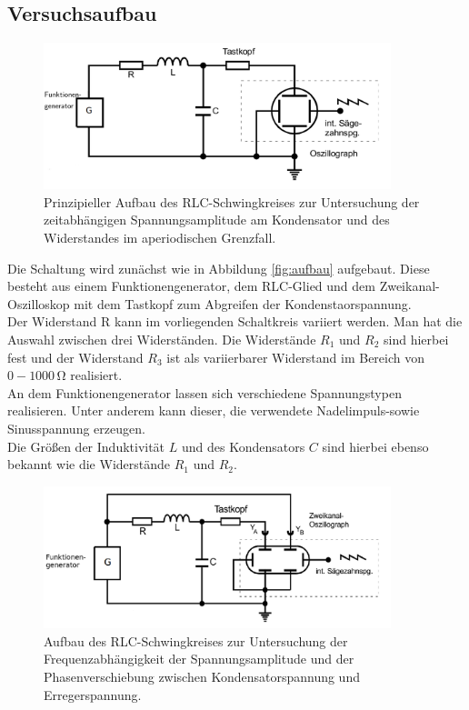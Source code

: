 \subsection{Versuchsaufbau}
\label{sec:Versuchsaufbau}
\begin{figure}
  \centering
  \includegraphics[width=0.9\textwidth]{Bilder/aufbaau.png}
  \caption{Prinzipieller Aufbau des RLC-Schwingkreises zur Untersuchung der zeitabhängigen Spannungsamplitude am Kondensator und des Widerstandes im aperiodischen Grenzfall.}
  \label{fig:aufbau}
\end{figure}
Die Schaltung wird zunächst wie in Abbildung \eqref{fig:aufbau} aufgebaut. Diese besteht aus einem Funktionengenerator, dem RLC-Glied und dem Zweikanal-Oszilloskop mit dem Tastkopf zum Abgreifen der Kondenstaorspannung.\\
Der Widerstand R kann im vorliegenden Schaltkreis variiert werden. Man hat die Auswahl zwischen drei Widerständen. Die Widerstände $R_\text{1}$ und $R_\text{2}$ sind hierbei fest und der Widerstand $R_\text{3}$ ist als variierbarer Widerstand im Bereich von $0-1000\,\si{\ohm}$ realisiert.\\
An dem Funktionengenerator lassen sich verschiedene Spannungstypen realisieren. Unter anderem kann dieser, die verwendete Nadelimpuls-sowie Sinusspannung erzeugen.\\
Die Größen der Induktivität $L$ und des Kondensators $C$ sind hierbei ebenso bekannt wie die Widerstände $R_\text{1}$ und $R_\text{2}$.

\begin{figure}
  \centering
  \includegraphics[width=0.9\textwidth]{Bilder/aufbauu.png}
  \caption{Aufbau des RLC-Schwingkreises zur Untersuchung der Frequenzabhängigkeit der Spannungsamplitude und der Phasenverschiebung zwischen Kondensatorspannung und Erregerspannung.}
  \label{fig:aufbau2}
\end{figure}

